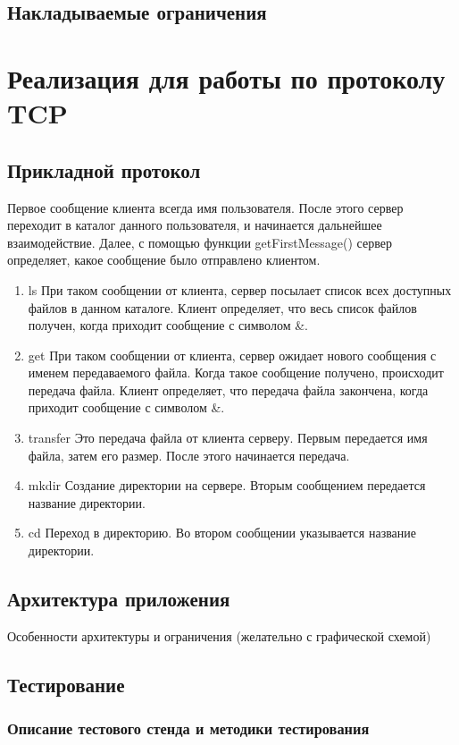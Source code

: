 \documentclass[12pt,a4paper]{report}
\begin{document}
\section{Накладываемые ограничения}

\chapter{Реализация для работы по протоколу TCP}
\section{Прикладной протокол}
\label{protocol_tcp}
Первое сообщение клиента всегда имя пользователя. После этого сервер переходит в каталог данного пользователя, и начинается дальнейшее взаимодействие.
Далее, с помощью функции getFirstMessage() сервер определяет, какое сообщение было отправлено клиентом. 
\begin{enumerate}
\item{ls}
При таком сообщении от клиента, сервер посылает список всех доступных файлов в данном каталоге. Клиент определяет, что весь список файлов получен, когда приходит сообщение с символом \&.
\item{get}
При таком сообщении от клиента, сервер ожидает нового сообщения с именем передаваемого файла. Когда такое сообщение получено, происходит передача файла. Клиент определяет, что передача файла закончена, когда приходит сообщение с символом \&.
\item{transfer}
Это передача файла от клиента серверу. Первым передается имя файла, затем его размер. После этого начинается передача.
\item{mkdir}
Создание директории на сервере. Вторым сообщением передается название директории.
\item{cd}
Переход в директорию. Во втором сообщении указывается название директории.
\end{enumerate} 
\section{Архитектура приложения}
Особенности архитектуры и ограничения (желательно с графической схемой) 

\section{Тестирование}
\subsection{Описание тестового стенда и методики тестирования}
\end{document}
